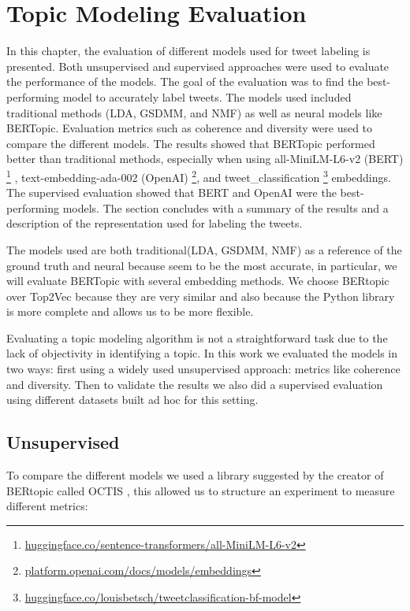 \section{Topic Modeling Evaluation}

    \graphicspath{{Chapter4/Figures}{Chapter4/Figures}}

In this chapter, the evaluation of different models used for tweet labeling is presented. Both unsupervised and supervised approaches were used to evaluate the performance of the models. 
The goal of the evaluation was to find the best-performing model to accurately label tweets. 
The models used included traditional methods (LDA, GSDMM, and NMF) as well as neural models like  BERTopic. Evaluation metrics such as coherence and diversity were used to compare the different models. The results showed that BERTopic performed better than traditional methods, especially when using all-MiniLM-L6-v2 (BERT) \footnote{\href{https://huggingface.co/sentence-transformers/all-MiniLM-L6-v2}{huggingface.co/sentence-transformers/all-MiniLM-L6-v2}}
, text-embedding-ada-002 (OpenAI) \footnote{\href{https://platform.openai.com/docs/models/embeddings}{platform.openai.com/docs/models/embeddings}}, and tweet\_classification \footnote{\href{https://huggingface.co/louisbetsch/tweetclassification-bf-model}{huggingface.co/louisbetsch/tweetclassification-bf-model}} embeddings. The supervised evaluation showed that BERT and OpenAI were the best-performing models. The section concludes with a summary of the results and a description of the representation used for labeling the tweets.

The models used are both traditional(LDA, GSDMM, NMF) as a reference of the ground truth and neural because seem to be the most accurate, in particular, we will evaluate BERTopic with several embedding methods. We choose BERtopic over Top2Vec because they are very similar and also because the Python library is more complete and allows us to be more flexible.

Evaluating a topic modeling algorithm is not a straightforward task due to the lack of objectivity in identifying a topic. In this work we evaluated the models in two ways: first using a widely used unsupervised approach: metrics like coherence and diversity. 
Then to validate the results we also did a supervised evaluation using different datasets built ad hoc for this setting.

\subsection{Unsupervised}
To compare the different models we used a library suggested by the creator of BERtopic called OCTIS \cite{DBLP:conf/clic-it/TerragniF21} \cite{terragni2020octis}, this allowed us to structure an experiment to measure different metrics:

